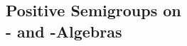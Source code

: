 
\begin{partbacktext}
\part[Positive Semigroups on \CA- and \WA-Algebras]{Positive Semigroups on \\ \CA- and \WA-Algebras}
\end{partbacktext}

\setcounter{chapter}{0}